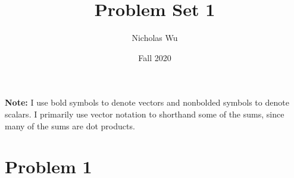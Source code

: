 \documentclass[10pt,letter]{article}
\newcommand{\problem}[1]{\section*{Problem #1}}
\begin{document}


\title{Problem Set 1}

\author{Nicholas Wu}

\date{Fall 2020}

\maketitle
\textbf{Note:} I use bold symbols to denote vectors and nonbolded symbols to denote scalars. I primarily use vector notation to shorthand some of the sums, since many of the sums are dot products.

\problem{1}
\end{document}
